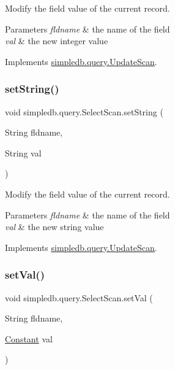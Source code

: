 Modify the field value of the current record. 
\begin{DoxyParams}{Parameters}
{\em fldname} & the name of the field \\
\hline
{\em val} & the new integer value \\
\hline
\end{DoxyParams}


Implements \hyperlink{interfacesimpledb_1_1query_1_1UpdateScan_ad866b1c21bbe8f0442a8779a6240c069}{simpledb.\+query.\+Update\+Scan}.

\mbox{\label{classsimpledb_1_1query_1_1SelectScan_a89d69e60a20cab136352370e7e27d1db}} 
\subsubsection{\texorpdfstring{set\+String()}{setString()}}
{\footnotesize\ttfamily void simpledb.\+query.\+Select\+Scan.\+set\+String (\begin{DoxyParamCaption}\item[{String}]{fldname,  }\item[{String}]{val }\end{DoxyParamCaption})\hspace{0.3cm}{\ttfamily [inline]}}

Modify the field value of the current record. 
\begin{DoxyParams}{Parameters}
{\em fldname} & the name of the field \\
\hline
{\em val} & the new string value \\
\hline
\end{DoxyParams}


Implements \hyperlink{interfacesimpledb_1_1query_1_1UpdateScan_a06d8414432dac908fd6c5d337e848f95}{simpledb.\+query.\+Update\+Scan}.

\mbox{\label{classsimpledb_1_1query_1_1SelectScan_a2c767921954b2e2ea83ef5d90712b64f}} 
\subsubsection{\texorpdfstring{set\+Val()}{setVal()}}
{\footnotesize\ttfamily void simpledb.\+query.\+Select\+Scan.\+set\+Val (\begin{DoxyParamCaption}\item[{String}]{fldname,  }\item[{\hyperlink{classsimpledb_1_1query_1_1Constant}{Constant}}]{val }\end{DoxyParamCaption})\hspace{0.3cm}{\ttfamily [inline]}}

